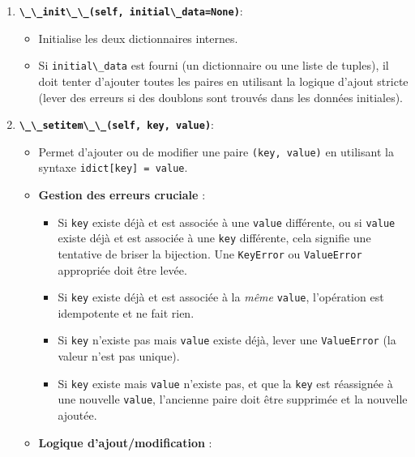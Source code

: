 \documentclass[12pt,a4paper]{report}
\newcommand{\passthrough}[1]{#1}
\providecommand{\tightlist}{%
  \setlength{\itemsep}{0pt}\setlength{\parskip}{0pt}}
\begin{document}
\begin{enumerate}
\def\labelenumi{\arabic{enumi}.}
\tightlist
\item
  \textbf{\passthrough{\lstinline!\_\_init\_\_(self, initial\_data=None)!}}:

  \begin{itemize}
  \tightlist
  \item
    Initialise les deux dictionnaires internes.
  \item
    Si \passthrough{\lstinline!initial\_data!} est fourni (un
    dictionnaire ou une liste de tuples), il doit tenter d'ajouter
    toutes les paires en utilisant la logique d'ajout stricte (lever des
    erreurs si des doublons sont trouvés dans les données initiales).
  \end{itemize}
\item
  \textbf{\passthrough{\lstinline!\_\_setitem\_\_(self, key, value)!}}:

  \begin{itemize}
  \tightlist
  \item
    Permet d'ajouter ou de modifier une paire
    \passthrough{\lstinline!(key, value)!} en utilisant la syntaxe
    \passthrough{\lstinline!idict[key] = value!}.
  \item
    \textbf{Gestion des erreurs cruciale} :

    \begin{itemize}
    \tightlist
    \item
      Si \passthrough{\lstinline!key!} existe déjà et est associée à une
      \passthrough{\lstinline!value!} différente, ou si
      \passthrough{\lstinline!value!} existe déjà et est associée à une
      \passthrough{\lstinline!key!} différente, cela signifie une
      tentative de briser la bijection. Une
      \passthrough{\lstinline!KeyError!} ou
      \passthrough{\lstinline!ValueError!} appropriée doit être levée.
    \item
      Si \passthrough{\lstinline!key!} existe déjà et est associée à la
      \emph{même} \passthrough{\lstinline!value!}, l'opération est
      idempotente et ne fait rien.
    \item
      Si \passthrough{\lstinline!key!} n'existe pas mais
      \passthrough{\lstinline!value!} existe déjà, lever une
      \passthrough{\lstinline!ValueError!} (la valeur n'est pas unique).
    \item
      Si \passthrough{\lstinline!key!} existe mais
      \passthrough{\lstinline!value!} n'existe pas, et que la
      \passthrough{\lstinline!key!} est réassignée à une nouvelle
      \passthrough{\lstinline!value!}, l'ancienne paire doit être
      supprimée et la nouvelle ajoutée.
    \end{itemize}
  \item
    \textbf{Logique d'ajout/modification} :


\end{itemize}
\end{enumerate}
\end{document}
